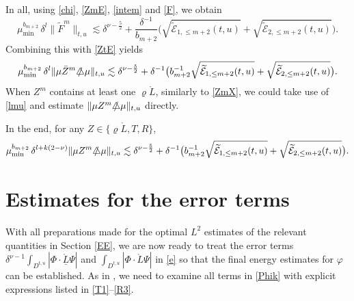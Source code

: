 \documentclass[11pt,twoside]{article}
\def\vp{\varphi}
\begin{document}
In all, using \eqref{chi}, \eqref{ZmE}, \eqref{intem} and \eqref{F}, we obtain
\begin{equation*}
\mu_{\min}^{b_{m+2}} \, \delta^l \|\tilde{F}^m\|_{t,u}
\lesssim \delta^{\nu - \frac{5}{2}}
+ \frac{\delta^{-1}}{b_{m+2}}
\big(\sqrt{\widetilde{\mathcal{E}}_{1,\leq m+2}(t,u)}
+ \sqrt{\widetilde{\mathcal{E}}_{2,\leq m+2}(t,u)}\big).
\end{equation*}
Combining this with \eqref{ZtE} yields
\begin{equation*}
\mu_{\min}^{b_{m+2}} \, \delta^l \|\mu \bar{Z}^m \slashed{\triangle} \mu\|_{t,u}
\lesssim \delta^{\nu - \frac{5}{2}}
+ \delta^{-1} \big( b_{m+2}^{-1} \sqrt{\widetilde{\mathcal{E}}_{1,\leq m+2}(t,u)}
+ \sqrt{\widetilde{\mathcal{E}}_{2,\leq m+2}(t,u)}\big).
\end{equation*}
When $Z^m$ contains at least one $\varrho\mathring L$, similarly to \eqref{ZmX},
we could take use of \eqref{lmu} and estimate $\|\mu{Z}^m \slashed{\triangle} \mu\|_{t,u}$ directly.

In the end, for any $Z\in\{\varrho\mathring L,T,R\}$,
\begin{equation}\label{Zmu}
\mu_{\min}^{b_{m+2}} \, \delta^{l+k(2-\nu)} \|\mu{Z}^m \slashed{\triangle} \mu\|_{t,u}
\lesssim \delta^{\nu - \frac{5}{2}}
+ \delta^{-1} \big( b_{m+2}^{-1} \sqrt{\widetilde{\mathcal{E}}_{1,\leq m+2}(t,u)}
+ \sqrt{\widetilde{\mathcal{E}}_{2,\leq m+2}(t,u)}\big).
\end{equation}

\section{Estimates for the error terms}\label{ert}

With all preparations made for the optimal $L^2$ estimates of the relevant quantities in Section \ref{EE},
we are now ready to treat the error terms $\delta^{\nu-1}\int_{D^{t, u}}|\Phi \cdot \mathring{\underline{L}}\Psi|$
and $\int_{D^{t, u}}|\Phi \cdot \mathring{L}\Psi|$ in \eqref{e} so that the final energy estimates for $\vp$ can be established.
As in \cite{M-Y, L-Y, Sp}, we need to examine all terms in \eqref{Phik} with explicit expressions listed in \eqref{T1}--\eqref{R3}.
\end{document}
